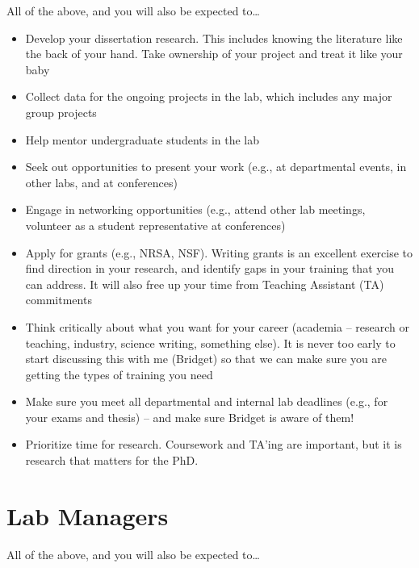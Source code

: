 \documentclass[]{book}
\providecommand{\tightlist}{%
  \setlength{\itemsep}{0pt}\setlength{\parskip}{0pt}}
\begin{document}
All of the above, and you will also be expected to\ldots{}

\begin{itemize}
\tightlist
\item
  Develop your dissertation research. This includes knowing the literature like the back of your hand. Take ownership of your project and treat it like your baby
\item
  Collect data for the ongoing projects in the lab, which includes any major group projects
\item
  Help mentor undergraduate students in the lab
\item
  Seek out opportunities to present your work (e.g., at departmental events, in other labs, and at conferences)
\item
  Engage in networking opportunities (e.g., attend other lab meetings, volunteer as a student representative at conferences)
\item
  Apply for grants (e.g., NRSA, NSF). Writing grants is an excellent exercise to find direction in your research, and identify gaps in your training that you can address. It will also free up your time from Teaching Assistant (TA) commitments
\item
  Think critically about what you want for your career (academia -- research or teaching, industry, science writing, something else). It is never too early to start discussing this with me (Bridget) so that we can make sure you are getting the types of training you need
\item
  Make sure you meet all departmental and internal lab deadlines (e.g., for your exams and thesis) -- and make sure Bridget is aware of them!
\item
  Prioritize time for research. Coursework and TA'ing are important, but it is research that matters for the PhD.
\end{itemize}

\hypertarget{lab-managers}{%
\section{Lab Managers}\label{lab-managers}}

All of the above, and you will also be expected to\ldots{}
\end{document}
